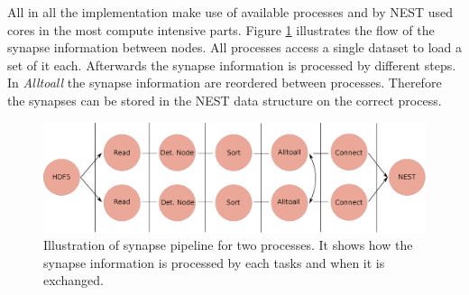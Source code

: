 \newpage
All in all the implementation make use of available processes and by NEST used cores in the most compute intensive parts.
Figure \ref{fig:ConnectInsideIteration} illustrates the flow of the synapse information between nodes. 
All processes access a single dataset to load a set of it each. Afterwards the synapse information is processed by different steps.
In \emph{Alltoall} the synapse information are reordered between processes.
Therefore the synapses can be stored in the NEST data structure on the correct process.
\begin{figure}[ht!]
\centering
\includegraphics[scale=0.4]{pictures/Connect_inside_iteration.eps}
\caption{Illustration of synapse pipeline for two processes. It shows how the synapse information is processed by each tasks and when it is exchanged.}
\label{fig:ConnectInsideIteration}
\end{figure}

\newpage
